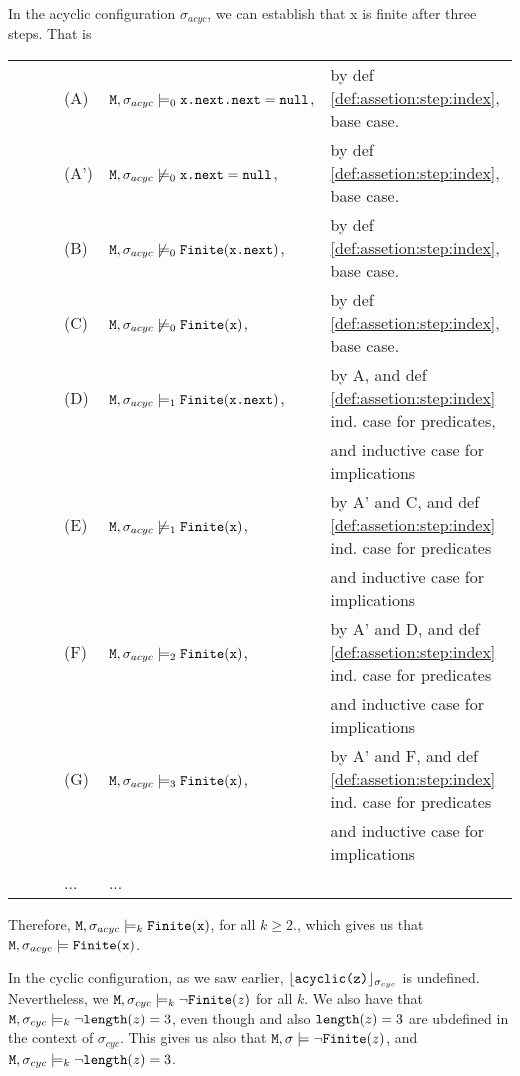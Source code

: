 \documentclass[acmsmall,screen]{acmart}
\begin{document}
\begin{example}
In the acyclic configuration $\sigma_{acyc}$, we can establish that x is finite after three steps. That is


\begin{tabular}{llll}
\ \ \ \ & (A) & ${\mbox{\tt{M}}},\sigma_{acyc}  \models_0   {\mbox{\tt{x.next.next}}}={\mbox{\tt{null}}} $,& by def \ref{def:assetion:step:index}, base case.\\
\ \ \ \ & (A') & ${\mbox{\tt{M}}},\sigma_{acyc}  \not \models_0   {\mbox{\tt{x.next}}}={\mbox{\tt{null}}} $,& by def \ref{def:assetion:step:index}, base case.\\
\ \ \ \ & (B) & ${\mbox{\tt{M}}},\sigma_{acyc} \not\models_0  {\mbox{\tt{Finite}}}({\mbox{\tt{x.next}}})$,& by def \ref{def:assetion:step:index}, base case.\\
\ \ \ \ & (C) & ${\mbox{\tt{M}}},\sigma_{acyc}  \not\models_0   {\mbox{\tt{Finite}}}({\mbox{\tt{x}}})$,& by def \ref{def:assetion:step:index}, base case.\\
\ \ \ \ & (D) & ${\mbox{\tt{M}}},\sigma_{acyc}   \models_1   {\mbox{\tt{Finite}}}({\mbox{\tt{x.next}}})$,& by A, and def \ref{def:assetion:step:index} ind.  case for predicates,\\
\ & & & and inductive case for implications\\
\ \ \ \ & (E) & ${\mbox{\tt{M}}},\sigma_{acyc}   \not\models_1   {\mbox{\tt{Finite}}}({\mbox{\tt{x}}})$,& by A' and C, and def \ref{def:assetion:step:index}  ind.  case for predicates\\
\ & & & and inductive case for implications\\
\ \ \ \ & (F) & ${\mbox{\tt{M}}},\sigma_{acyc}    \models_2   {\mbox{\tt{Finite}}}({\mbox{\tt{x}}})$,& by A' and D, and def \ref{def:assetion:step:index}  ind.  case for predicates\\
\ & & & and inductive case for implications\\
\ \ \ \ & (G) & ${\mbox{\tt{M}}},\sigma_{acyc}    \models_3   {\mbox{\tt{Finite}}}({\mbox{\tt{x}}})$,& by A' and F,  and def \ref{def:assetion:step:index}  ind.  case for predicates\\
\ & & & and inductive case for implications\\
& ... & ...
\end{tabular}

Therefore,    ${\mbox{\tt{M}}},\sigma_{acyc}    \models_k   {\mbox{\tt{Finite}}}({\mbox{\tt{x}}})$, for all $k \geq 2.$, which gives us that
  ${\mbox{\tt{M}}},\sigma_{acyc}    \models   {\mbox{\tt{Finite}}}({\mbox{\tt{x}}})$.


\vspace{.01in}
In the cyclic configuration, as we saw earlier, ${\lfloor{ {{\mbox{\tt{acyclic(z)}}}}}\rfloor_{\sigma_{cyc}}}$ is undefined. Nevertheless, we  ${\mbox{\tt{M}}}, \sigma_{cyc} \models_k \neg {\mbox{\tt{Finite}}}({z})$ for all $k$.
  We also have that ${\mbox{\tt{M}}}, \sigma_{cyc} \models_k \neg {\mbox{\tt{length}}}(z)=3$, even though   and also ${\mbox{\tt{length}}}(z)=3$ are ubdefined
 in the context of $\sigma_{cyc}$.
This gives us   also that
${\mbox{\tt{M}}}, \sigma \models \neg {\mbox{\tt{Finite}}}({z})$, and ${\mbox{\tt{M}}}, \sigma_{cyc} \models_k \neg {\mbox{\tt{length}}}(z)=3$.
\end{example}
\end{document}

